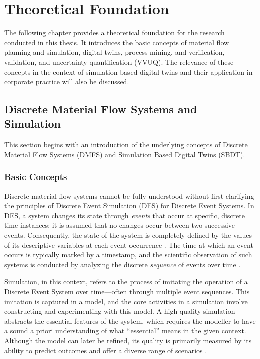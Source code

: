 \chapter{Theoretical Foundation}
\label{chap:theory}

The following chapter provides a theoretical foundation for the research conducted in this thesis. It introduces the basic concepts of material flow planning and simulation, digital twins, process mining, and verification, validation, and uncertainty quantification (VVUQ). The relevance of these concepts in the context of simulation-based digital twins and their application in corporate practice will also be discussed.


\section{Discrete Material Flow Systems and Simulation}
This section begins with an introduction of the underlying concepts of Discrete Material Flow Systems (DMFS) and Simulation Based Digital Twins (SBDT).
\label{sec:material-flow}
\subsection{Basic Concepts}
Discrete material flow systems cannot be fully understood without first clarifying the principles of Discrete Event Simulation (DES) for Discrete Event Systems. In DES, a system changes its state through \textit{events} that occur at specific, discrete time instances; it is assumed that no changes occur between two successive events. Consequently, the state of the system is completely defined by the values of its descriptive variables at each event occurrence \autocite{varga2001discrete}. The time at which an event occurs is typically marked by a timestamp, and the scientific observation of such systems is conducted by analyzing the discrete \textit{sequence} of events over time \autocite{robinson2014simulation}.

Simulation, in this context, refers to the process of imitating the operation of a Discrete Event System over time—often through multiple event sequences. This imitation is captured in a model, and the core activities in a simulation involve constructing and experimenting with this model. A high-quality simulation abstracts the essential features of the system, which requires the modeller to have a sound a priori understanding of what “essential” means in the given context. Although the model can later be refined, its quality is primarily measured by its ability to predict outcomes and offer a diverse range of scenarios \autocite{maria1997introduction}.

